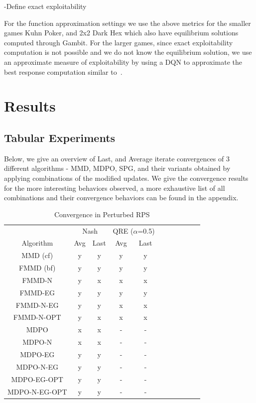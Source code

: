 -Define exact exploitability

For the function approximation settings we use the above metrics for the smaller games Kuhn Poker,
and 2x2 Dark Hex which also have equilibrium solutions computed through Gambit.
For the larger games, since exact exploitability computation is not possible and we do not know the
equilibrium solution, we use an approximate measure of exploitability by using a DQN to approximate
the best response computation similar to~\cite{sokotaUnified2023}.

\section{Results}

\subsection{Tabular Experiments}
Below, we give an overview of Last, and Average iterate convergences of 3 different algorithms -
MMD, MDPO, SPG, and their variants obtained by applying combinations of the modified updates.
We give the convergence results for the more interesting behaviors observed, a more exhaustive list
of all combinations and their convergence behaviors can be found in the appendix.

\begin{table}
	\centering
	\begin{tabular}{|c|c|c|c|c|c|c|c|c|c|c|}
		\hline
		& \multicolumn{2}{c|}{Nash} & \multicolumn{2}{c|}{QRE ($\alpha$=0.5)}              \\
		\cline{2-5}
		Algorithm         		& Avg & Last & Avg & Last \\
		 \toprule 
		\hline MMD (cf)			& y & y & y & y \\ 
		\hline FMMD (bf)		& y & y & y & y \\
		\hline FMMD-N			& y & x & x & x \\
		\hline FMMD-EG			& y & y & y & y \\
		\hline FMMD-N-EG		& y & y & x & x \\
		\hline FMMD-N-OPT		& y & x & x & x \\
		\hline MDPO				& x & x & - & - \\
		\hline MDPO-N			& x & x & - & - \\
		\hline MDPO-EG			& y & y & - & - \\
		\hline MDPO-N-EG		& y & y & - & - \\
		\hline MDPO-EG-OPT		& y & y & - & - \\
		\hline MDPO-N-EG-OPT	& y & y & - & - \\
		\hline

	\end{tabular} \caption{Convergence in Perturbed RPS}
	\label{tab:tabular}
\end{table}

